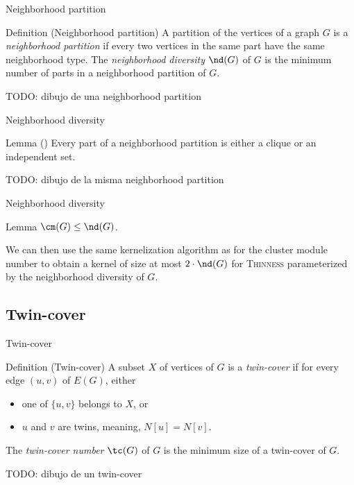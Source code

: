 \documentclass{beamer}
\begin{document}
\begin{frame}{Neighborhood partition}
    \begin{block}{Definition (Neighborhood partition)}
        A partition of the vertices of a graph $G$ is a \emph{neighborhood partition} if every two vertices in the same part have the same neighborhood type. The \emph{neighborhood diversity} $\nd(G)$ of $G$ is the minimum number of parts in a neighborhood partition of $G$.
    \end{block}
    TODO: dibujo de una neighborhood partition
\end{frame}

\begin{frame}{Neighborhood diversity}
    \begin{block}{Lemma (\cite{neighborhood-diversity})}
        Every part of a neighborhood partition is either a clique or an independent set.
    \end{block}

    TODO: dibujo de la misma neighborhood partition
\end{frame}

\begin{frame}{Neighborhood diversity}
    \begin{block}{Lemma}
        $\cm(G) \leq \nd(G)$.
    \end{block}
    \pause
    \vspace{1em}
    We can then use the same kernelization algorithm as for the cluster module number to obtain a kernel of size at most $2 \cdot \nd(G)$ for \textsc{Thinness} parameterized by the neighborhood diversity of $G$.
\end{frame}

\subsection{Twin-cover}
\begin{frame}{Twin-cover}
    \begin{block}{Definition (Twin-cover)}
        A subset $X$ of vertices of $G$ is a \emph{twin-cover} if for every edge $(u, v)$ of $E(G)$, either
        \begin{itemize}
            \item one of $\{u, v\}$ belongs to $X$, or
            \item $u$ and $v$ are twins, meaning, $N[u] = N[v]$.
        \end{itemize}

        The \emph{twin-cover number} $\tc(G)$ of $G$ is the minimum size of a twin-cover of $G$.
    \end{block}

    TODO: dibujo de un twin-cover
\end{frame}
\end{document}
